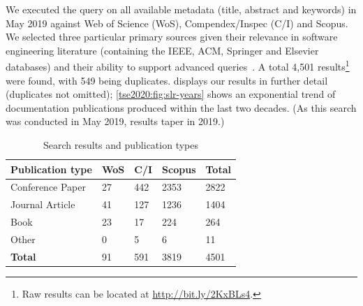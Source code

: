 We executed the query on all available metadata (title, abstract and keywords) in May 2019 against Web of Science  (WoS), Compendex/Inspec (C/I) and Scopus. We selected three particular primary sources given their relevance in software engineering literature (containing the IEEE, ACM, Springer and Elsevier databases) and their ability to support advanced queries~\citep{Brereton:2007by,Kitchenham:2007dd}. A total 4,501 results\footnote{Raw results can be located at \url{http://bit.ly/2KxBLs4}.} were found, with 549 being duplicates.  displays our results in further detail (duplicates not omitted); \cref{tse2020:fig:slr-years} shows an exponential trend of  documentation publications produced within the last two decades. (As this search was conducted in May 2019, results taper in 2019.)

\begin{table}[tb]
  \caption[Summary of search results in API documentation knowledge]{Search results and publication types}
  \label{tse2020:tab:search-results}
  \centering
  \begin{tabular}{l|lll|l}
    \toprule
    \textbf{Publication type} &
    \textbf{WoS} &
    \textbf{C/I} &
    \textbf{Scopus} &
    \textbf{Total} \\
    \midrule
    Conference Paper & 27 & 442 & 2353 & 2822 \\
    Journal Article & 41 & 127 & 1236 & 1404\\
    Book & 23 & 17 & 224 & 264\\
    Other & 0 & 5 & 6 & 11\\
    \midrule
    \textbf{Total} & 91 & 591 & 3819 & 4501\\
    \bottomrule
  \end{tabular}
\end{table}

